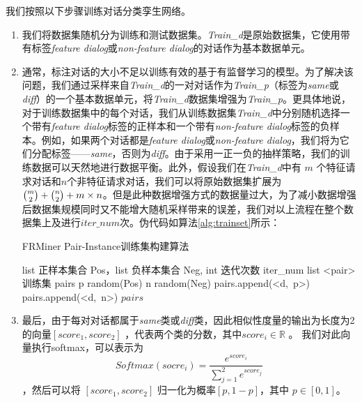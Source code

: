 我们按照以下步骤训练对话分类孪生网络。
\begin{enumerate}
    \item 我们将数据集随机分为训练和测试数据集。\textit{Train\_d}是原始数据集，它使用带有标签\textit{feature dialog}或\textit{non-feature dialog}的对话作为基本数据单元。
    \item 通常，标注对话的大小不足以训练有效的基于有监督学习的模型。为了解决该问题，我们通过采样来自\textit{Train\_d}的一对对话作为\textit{Train\_p}（标签为\textit{same}或\textit{diff}）的一个基本数据单元，将\textit{Train\_d}数据集增强为\textit{Train\_p}。更具体地说，对于训练数据集中的每个对话，我们从训练数据集\textit{Train\_d}中分别随机选择一个带有\textit{feature dialog}标签的正样本和一个带有\textit{non-feature dialog}标签的负样本。例如，如果两个对话都是\textit{feature dialog}或\textit{non-feature dialog}，我们将为它们分配标签——\textit{same}，否则为\textit{diff}。由于采用一正一负的抽样策略，我们的训练数据可以天然地进行数据平衡。此外，假设我们在\textit{Train\_d}中有 $m$ 个特征请求对话和$n$个非特征请求对话，我们可以将原始数据集扩展为 $\tbinom{m}{2}+\tbinom{n}{2}+m\times n$。但是此种数据增强方式的数据量过大，为了减小数据增强后数据集规模同时又不能增大随机采样带来的误差，我们对以上流程在整个数据集上及进行$iter\_num$次。伪代码如算法\ref{alg:trainset}所示：
    \begin{algorithm}[htbp]
            \caption{FRMiner Pair-Instance训练集构建算法}  
            \label{alg:trainset}
            \begin{algorithmic}[1]
                \Require list 正样本集合 Pos，list 负样本集合 Neg, int 迭代次数 iter\_num 
                \Ensure list <pair> 训练集 
                    \State pairs \gets [\ ]
                            \State p \gets random(Pos)
                            \State n \gets random(Neg)
                            \State pairs.append(<d,\ p>)
                            \State pairs.append(<d,\ n>)
                        \EndFor
                    \EndFor
                    \State \Return $pairs$
                \EndFunction  
            \end{algorithmic}  
    \end{algorithm}
    \item 最后，由于每对对话都属于\textit{same}类或\textit{diff}类，因此相似性度量的输出为长度为2的向量$[score_1 , score_2]$  ，代表两个类的分数，其中$score_i \in \mathbb{R}$ 。 我们对此向量执行softmax，可以表示为
    $$Softmax(socre_i)=\frac{e^{score_i}}{\sum_{j=1}^2 e^{score_j}}$$ 
    ，然后可以将 $[score_1 , score_2]$ 归一化为概率$[p ,1-p]$，其中 $p \in [0,1]$。
\end{enumerate}

